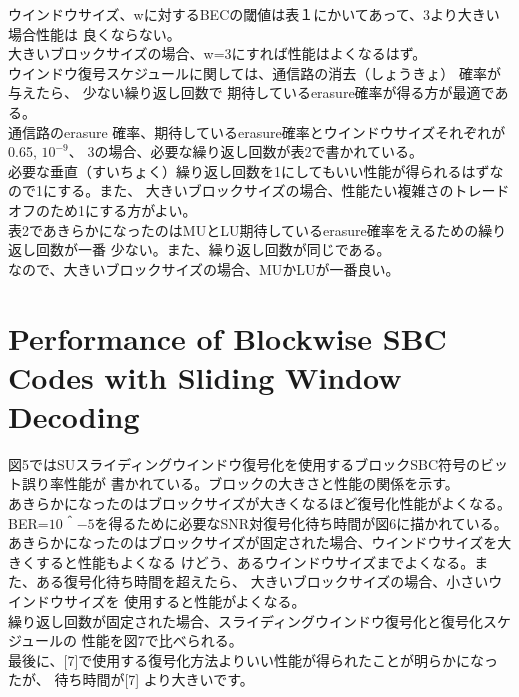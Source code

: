 \documentclass[20 pts]{article}
\begin{document}
ウインドウサイズ、wに対するBECの閾値は表１にかいてあって、3より大きい場合性能は
良くならない。\\
大きいブロックサイズの場合、w=3にすれば性能はよくなるはず。\\

ウインドウ復号スケジュールに関しては、通信路の消去（しょうきょ） 確率が与えたら、
少ない繰り返し回数で
期待しているerasure確率が得る方が最適である。\\
通信路のerasure 確率、期待しているerasure確率とウインドウサイズそれぞれが0.65, 
$10^{-9}$、
 3の場合、必要な繰り返し回数が表2で書かれている。\\
 
 必要な垂直（すいちょく）繰り返し回数を1にしてもいい性能が得られるはずなので1にする。また、
 大きいブロックサイズの場合、性能たい複雑さのトレードオフのため1にする方がよい。\\
 
 表2であきらかになったのはMUとLU期待しているerasure確率をえるための繰り返し回数が一番
 少ない。また、繰り返し回数が同じである。\\
 
 なので、大きいブロックサイズの場合、MUかLUが一番良い。\\

\section{Performance of Blockwise SBC Codes with Sliding Window Decoding}
図5ではSUスライディングウインドウ復号化を使用するブロックSBC符号のビット誤り率性能が
書かれている。ブロックの大きさと性能の関係を示す。\\

あきらかになったのはブロックサイズが大きくなるほど復号化性能がよくなる。\\

BER=$10＾{-5}$を得るために必要なSNR対復号化待ち時間が図6に描かれている。\\
あきらかになったのはブロックサイズが固定された場合、ウインドウサイズを大きくすると性能もよくなる
けどう、あるウインドウサイズまでよくなる。また、ある復号化待ち時間を超えたら、
大きいブロックサイズの場合、小さいウインドウサイズを
使用すると性能がよくなる。\\

繰り返し回数が固定された場合、スライディングウインドウ復号化と復号化スケジュールの
性能を図7で比べられる。\\


最後に、[7]で使用する復号化方法よりいい性能が得られたことが明らかになったが、
待ち時間が[7]
より大きいです。\\
\end{document}
